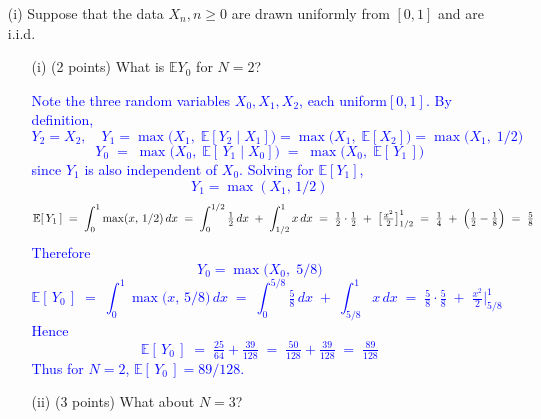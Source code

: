 \documentclass{article}
\begin{document}
\begin{enumerate}
    \item[(i)] Suppose that the data $X_n, n \geq 0$ are drawn uniformly from $[0, 1]$ and are i.i.d.
    \begin{enumerate}
        \item[(i)] (2 points) What is $\mathbb{E}Y_0$ for $N = 2$?

        \textcolor{blue}{
\noindent
Note the three random variables $X_0, X_1, X_2$, each uniform$[0,1]$. By definition,
\[
Y_2 = X_2,
\quad
Y_1 = \max\bigl(X_1,\; \mathbb{E}[Y_2 \mid X_1]\bigr)
     = \max\bigl(X_1,\; \mathbb{E}[X_2]\bigr)
     = \max\bigl(X_1,\; 1/2\bigr)
\]
\[
Y_0 
\;=\; 
\max\bigl(X_0,\; \mathbb{E}[\,Y_1 \mid X_0]\bigr)
\;=\;
\max\bigl(X_0,\; \mathbb{E}[\,Y_1\,]\bigr)
\]
since $Y_1$ is also independent of $X_0$. 
Solving for $\mathbb{E}[Y_1]$,
\[
Y_1 = \max(X_1,\,1/2)
\]
\[
\mathbb{E}[\,Y_1\,]
\;=\;
\int_0^1 \max(x,\,1/2)\,dx
\;=\;
\int_{0}^{1/2} \tfrac12\,dx \;+\;\int_{1/2}^{1} x\,dx
\;=\;
\tfrac12 \cdot \tfrac12 \;+\;\bigl[\tfrac{x^2}{2}\bigr]_{1/2}^1
\;=\;
\tfrac{1}{4} \;+\;\Bigl(\tfrac12 - \tfrac{1}{8}\Bigr)
\;=\;
\tfrac{5}{8}
\]
Therefore
\[
Y_0 = \max\bigl(X_0,\; 5/8\bigr)
\]
\[
\mathbb{E}[\,Y_0\,]
\;=\;
\int_0^1 \max\bigl(x,\,5/8\bigr)\,dx
\;=\;
\int_0^{5/8} \tfrac{5}{8}\,dx
\;+\;
\int_{5/8}^{1} x\,dx
\;=\;
\tfrac{5}{8}\cdot \tfrac{5}{8}
\;+\;
\tfrac{x^2}{2}\Bigr|_{5/8}^1
\]
Hence
\[
\mathbb{E}[\,Y_0\,]
\;=\;
\tfrac{25}{64} + \tfrac{39}{128}
\;=\;
\tfrac{50}{128} + \tfrac{39}{128}
\;=\;
\tfrac{89}{128}
\]
Thus for $N=2$, $\mathbb{E}[\,Y_0\,] = 89/128$.
        }

        \item[(ii)] (3 points) What about $N = 3$?


\end{enumerate}
\end{enumerate}
\end{document}
